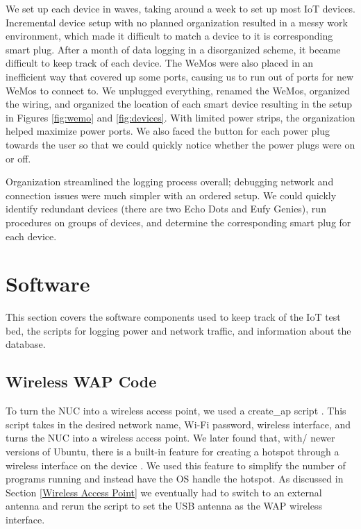 We set up each device in waves, taking around a week to set up most IoT devices. Incremental device setup with no planned organization resulted in a messy work environment, which made it difficult to match a device to it is corresponding smart plug. After a month of data logging in a disorganized scheme, it became difficult to keep track of each device. The WeMos were also placed in an inefficient way that covered up some ports, causing us to run out of ports for new WeMos to connect to. We unplugged everything, renamed the WeMos, organized the wiring, and organized the location of each smart device resulting in the setup in Figures \ref{fig:wemo} and \ref{fig:devices}. With limited power strips, the organization helped maximize power ports. We also faced the button for each power plug towards the user so that we could quickly notice whether the power plugs were on or off.

Organization streamlined the logging process overall; debugging network and connection issues were much simpler with an ordered setup. We could quickly identify redundant devices (there are two Echo Dots and Eufy Genies), run procedures on groups of devices, and determine the corresponding smart plug for each device.

\section{Software}
\label{software}
This section covers the software components used to keep track of the IoT test bed, the scripts for logging power and network traffic, and information about the database.

\subsection{Wireless WAP Code}
To turn the NUC into a wireless access point, we used a create\_ap script \cite{oblique_2017}. This script takes in the desired network name, Wi-Fi password, wireless interface, and turns the NUC into a wireless access point. We later found that, with/ newer versions of Ubuntu, there is a built-in feature for creating a hotspot through a wireless interface on the device \cite{m_2016}. We used this feature to simplify the number of programs running and instead have the OS handle the hotspot. As discussed in Section \ref{Wireless Access Point} we eventually had to switch to an external antenna and rerun the script to set the USB antenna as the WAP wireless interface.

